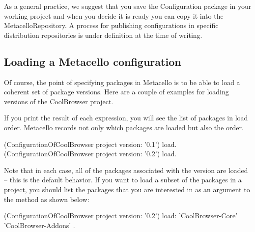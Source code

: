 \documentclass[a4paper,10pt,twoside]{book}
\begin{document}

As a general practice, we suggest that you save the Configuration package in your working project and when you decide it is ready you can copy it into the MetacelloRepository. A process for publishing configurations in specific distribution repositories is under definition at the time of writing.



\subsection{Loading a Metacello configuration}
Of course, the point of specifying packages in Metacello is to be able to load a coherent set of package versions. Here are a couple of examples for loading versions of the CoolBrowser project. 

If you print the result of each expression, you will see the list of packages in load order. Metacello records not only which packages are loaded but also the order. 

\begin{code}{}
  (ConfigurationOfCoolBrowser project version: '0.1') load.
  (ConfigurationOfCoolBrowser project version: '0.2') load.
\end{code}
  
Note that in each case, all of the packages associated with the version are loaded \--- this  
is the default behavior. If you want to load a subset of the packages in a project, you should list 
the packages that you are interested in as an argument to the  method as shown below:

\begin{code}{}
  (ConfigurationOfCoolBrowser project version: '0.2') load: { 'CoolBrowser-Core' 'CoolBrowser-Addons' }.
\end{code}
\end{document}
